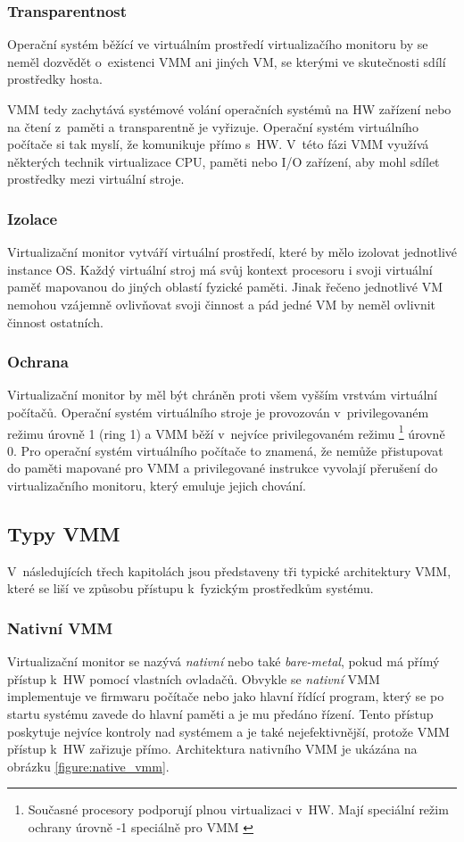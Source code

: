 \subsubsection{Transparentnost}
\label{chapter:virtualization:vmm:demands:transparency}
Operační systém běžící ve virtuálním prostředí virtualizačího monitoru by se neměl dozvědět o~existenci VMM ani jiných VM,
se kterými ve skutečnosti sdílí prostředky hosta.

VMM tedy zachytává systémové volání operačních systémů na HW zařízení nebo na čtení z~paměti a transparentně je vyřizuje.
Operační systém virtuálního počítače si tak myslí, že komunikuje přímo s~HW. V~této fázi VMM využívá některých technik virtualizace
CPU, paměti nebo I/O zařízení, aby mohl sdílet prostředky mezi virtuální stroje.
\subsubsection{Izolace}
\label{chapter:virtualization:vmm:demands:isolation}
Virtualizační monitor vytváří virtuální prostředí, které by mělo izolovat jednotlivé instance OS. Každý virtuální stroj má 
svůj kontext procesoru i svoji virtuální paměť mapovanou do jiných oblastí fyzické paměti. Jinak řečeno jednotlivé VM nemohou
vzájemně ovlivňovat svoji činnost a pád jedné VM by neměl ovlivnit činnost ostatních.
\subsubsection{Ochrana}
\label{chapter:virtualization:vmm:demands:access}
Virtualizační monitor by měl být chráněn proti všem vyšším vrstvám virtuální počítačů. Operační systém virtuálního stroje 
je provozován v~privilegovaném režimu úrovně 1 (ring 1) a VMM běží v~nejvíce privilegovaném režimu 
\footnote[1]{Současné procesory podporují plnou virtualizaci v~HW. Mají speciální  režim ochrany úrovně -1 speciálně pro VMM
\cite{cvut:presentation:virt2}} úrovně 0. Pro operační systém virtuálního počítače to znamená, že nemůže přistupovat do paměti
mapované pro VMM a privilegované instrukce vyvolají přerušení do virtualizačního monitoru, který emuluje jejich chování. 
\subsection{Typy VMM}
\label{chapter:virtualization:vmm:types}
V~následujících třech kapitolách jsou představeny tři typické architektury VMM, které se liší ve způsobu přístupu k~fyzickým
prostředkům systému.
\subsubsection{Nativní VMM}
\label{chapter:virtualization:vmm:types:native}
Virtualizační monitor se nazývá \textit{nativní} nebo také \textit{bare-metal}, pokud má přímý přístup k~HW pomocí vlastních ovladačů.
Obvykle se \textit{nativní} VMM implementuje ve firmwaru počítače nebo jako hlavní řídící program, který se po startu systému
zavede do hlavní paměti a je mu předáno řízení. Tento přístup poskytuje nejvíce kontroly nad systémem a je také nejefektivnější,
protože VMM přístup k~HW zařizuje přímo. Architektura nativního VMM je ukázána na obrázku \ref{figure:native_vmm}.

